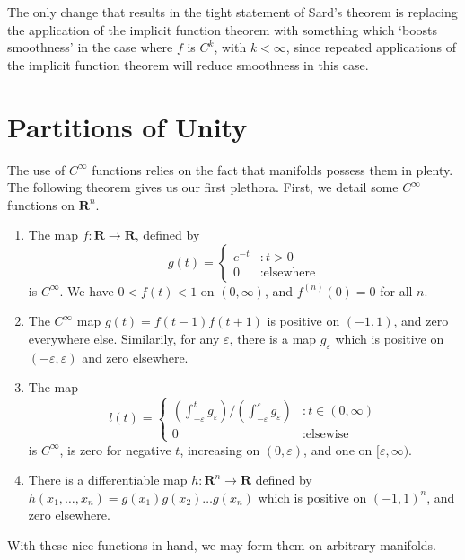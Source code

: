 \begin{remark}
    The only change that results in the tight statement of Sard's theorem is replacing the application of the implicit function theorem with something which `boosts smoothness' in the case where $f$ is $C^k$, with $k < \infty$, since repeated applications of the implicit function theorem will reduce smoothness in this case.
\end{remark}

\section{Partitions of Unity}

The use of $C^\infty$ functions relies on the fact that manifolds possess them in plenty. The following theorem gives us our first plethora. First, we detail some $C^\infty$ functions on $\mathbf{R}^n$.

\begin{enumerate}
    \item The map $f:\mathbf{R} \to \mathbf{R}$, defined by
    \[
    g(t) =
    \begin{cases}
        e^{-t} & : t > 0\\
        0 & : \text{elsewhere}
    \end{cases}
    \]
    is $C^\infty$. We have $0 < f(t) < 1$ on $(0,\infty)$, and $f^{(n)}(0) = 0$ for all $n$.
    \item The $C^\infty$ map $g(t) = f(t-1)f(t+1)$ is positive on $(-1,1)$, and zero everywhere else. Similarily, for any $\varepsilon$, there is a map $g_\varepsilon$ which is positive on $(-\varepsilon, \varepsilon)$ and zero elsewhere.
    \item The map 
    \[ l(t) = \begin{cases}
        \left(\int_{-\varepsilon}^t g_\varepsilon \right)/\left(\int_{-\varepsilon}^\varepsilon g_\varepsilon \right) & : t \in (0, \infty) \\
        0 & : \text{elsewise}
    \end{cases} \]
    is $C^\infty$, is zero for negative $t$, increasing on $(0, \varepsilon)$, and one on $[\varepsilon, \infty)$.
    \item There is a differentiable map $h:\mathbf{R}^n \to \mathbf{R}$ defined by $h(x_1, \dots, x_n) = g(x_1) g(x_2) \dots g(x_n)$ which is positive on $(-1, 1)^n$, and zero elsewhere.
\end{enumerate}

With these nice functions in hand, we may form them on arbitrary manifolds.

